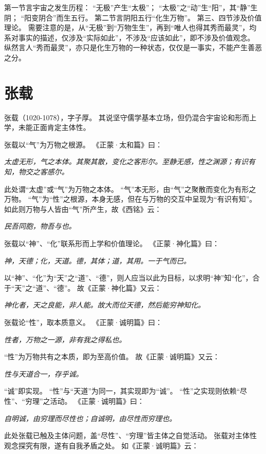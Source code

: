 \documentclass[11pt]{article}
\begin{document}
第一节言宇宙之发生历程：
“无极”产生“太极”；
“太极”之“动”生“阳”，其“静”生阴；
“阳变阴合”而生五行。
第二节言阴阳五行“化生万物”。
第三、四节涉及价值理论。
需要注意的是，从“无极”到“万物生生”，再到“唯人也得其秀而最灵”，均系对事实的描述，仅涉及“实际如此”，不涉及“应该如此”，即不涉及价值观念。
纵然言人“秀而最灵”，亦只是化生万物的一种状态，仅仅是一事实，不能产生善恶之分。

\section{张载}
张载（1020-1078），字子厚。
其说坚守儒学基本立场，但仍混合宇宙论和形而上学，未能正面肯定主体性。

\par

张载以“气”为万物之根源。
《正蒙·太和篇》曰：

\textit{太虚无形，气之本体。其聚其散，变化之客形尔。至静无感，性之渊源；有识有知，物交之客感尔。}

此处谓“太虚”或“气”为万物之本体。
“气”本无形，由“气”之聚散而变化为有形之万物。
“气”为“性”之根源，本身无感，但在与万物的交互中呈现为“有识有知”。
如此则万物与人皆由“气”所产生，故《西铭》云：

\textit{民吾同胞，物吾与也。}

\par

张载以“神”、“化”联系形而上学和价值理论。
《正蒙·神化篇》曰：

\textit{神，天德；化，天道。德，其体；道，其用。一于气而已。}

以“神”、“化”为“天”之“道”、“德”，则人应当以此为目标，以求明“神”知“化”，合于“天”之“道”、“德”。
故《正蒙·神化篇》又云：

\textit{神化者，天之良能，非人能。故大而位天德，然后能穷神知化。}

\par

张载论“性”，取本质意义。
《正蒙·诚明篇》曰：

\textit{性者，万物之一源，非有我之得私也。}

“性”为万物共有之本质，即为至高价值。
故《正蒙·诚明篇》又云：

\textit{性与天道合一，存乎诚。}

“诚”即实现。
“性”与“天道”为同一，其实现即为“诚”。
“性”之实现则依赖“尽性”、“穷理”之活动。
《正蒙·诚明篇》曰：

\textit{自明诚，由穷理而尽性也；自诚明，由尽性而穷理也。}

此处张载已触及主体问题，盖“尽性”、“穷理”皆主体之自觉活动。
张载对主体性观念探究有限，遂有自我矛盾之处。
如《正蒙·诚明篇》云：
\end{document}

